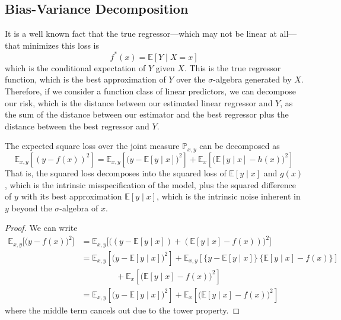 \subsection{Bias-Variance Decomposition} 

  It is a well known fact that the true regressor---which may not be linear at all---that minimizes this loss is 
  \begin{equation}
    f^\ast (x) = \mathbb{E}[Y \mid X = x]
  \end{equation}
  which is the conditional expectation of $Y$ given $X$. This is the true regressor function, which is the best approximation of $Y$ over the $\sigma$-algebra generated by $X$. Therefore, if we consider a function class of linear predictors, we can decompose our risk, which is the distance between our estimated linear regressor and $Y$, as the sum of the distance between our estimator and the best regressor plus the distance between the best regressor and $Y$. 

  \begin{theorem}
    The expected square loss over the joint measure $\mathbb{P}_{x, y}$ can be decomposed as 
    \begin{equation}
      \mathbb{E}_{x, y} [( y - f(x))^2] = \mathbb{E}_{x, y} [\big(y - \mathbb{E}[y \mid x]\big)^2] + \mathbb{E}_x [\big(\mathbb{E}[y \mid x] - h(x) \big)^2]
    \end{equation}
    That is, the squared loss decomposes into the squared loss of $\mathbb{E}[y \mid x]$ and $g(x)$, which is the intrinsic misspecification of the model, plus the squared difference of $y$ with its best approximation $\mathbb{E}[y \mid x]$, which is the intrinsic noise inherent in $y$ beyond the $\sigma$-algebra of $x$. 
  \end{theorem}
  \begin{proof}
    We can write 
    \begin{align}
      \mathbb{E}_{x, y} \big[ \big(y - f(x)\big)^2 \big] & = \mathbb{E}_{x, y}\big[ \big((y - \mathbb{E}[y \mid x]) + (\mathbb{E}[y \mid x] - f(x)) \big)^2 \big] \\
      & = \mathbb{E}_{x, y} [\big(y - \mathbb{E}[y \mid x]\big)^2] + \mathbb{E}_{x, y} [\{y - \mathbb{E} [y \mid x]\} \, \{ \mathbb{E}[y \mid x] - f(x) \}] \\
      & \;\;\;\;\;\;\;\;\;\;\;\;\;\;\; + \mathbb{E}_x [\big(\mathbb{E}[y \mid x] - f(x) \big)^2] \\
      & = \mathbb{E}_{x, y} [\big(y - \mathbb{E}[y \mid x]\big)^2] + \mathbb{E}_x [\big(\mathbb{E}[y \mid x] - f(x) \big)^2]
    \end{align}
    where the middle term cancels out due to the tower property. 
  \end{proof}

